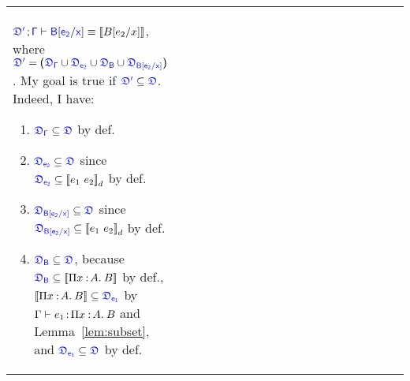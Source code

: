 \begin{theorem}
\begin{longtable}{p{0.05\linewidth} p{0.95\linewidth}}
$\target{\fdef'} \semicolon \target{\Gamma} \vdash \target{B}\targetsub{e_2}{x} \equiv \bbracket{B\sub{e_2}{x}}$, where
$\target{\fdef'} = \sfpl \target{\fdef_{\Gamma}} \cup \target{\fdef_{e_2}} \cup \target{\fdef_{B}} \cup \target{\fdef_{B\sub{e_2}{x}}} \sfpr$. My goal is true if $\target{\fdef'} \subseteq \target{\fdef}$. Indeed, I have:
\begin{enumerate}
\item $\target{\fdef_{\Gamma}} \subseteq \target{\fdef}$ by def.
\item $\target{\fdef_{e_2}} \subseteq \target{\fdef}$ since $\target{\fdef_{e_2}} \subseteq \bbracket{e_1\ e_2}_d$ by def.
\item $\target{\fdef_{B\sub{e_2}{x}}} \subseteq \target{\fdef}$ since $\target{\fdef_{B\sub{e_2}{x}}} \subseteq \bbracket{e_1\ e_2}_d$ by def.
\item $\target{\fdef_{B}} \subseteq \target{\fdef}$, because $\target{\fdef_{B}} \subseteq \bbracket{\pitype{x}{A}{B}}$ by def., $\bbracket{\pitype{x}{A}{B}} \subseteq \target{\fdef_{e_1}}$ by $\Gamma \vdash e_1 \hspace{0.5mm}{:}\hspace{0.5mm} \Pi x\mkern1.5mu{\hspace{0.5mm}{:}\hspace{0.5mm}} A.\hspace{0.8mm}B$ and Lemma~\ref{lem:subset}, and $\target{\fdef_{e_1}} \subseteq \target{\fdef}$ by def.
\end{enumerate}
\\


\end{longtable}
\end{theorem}
